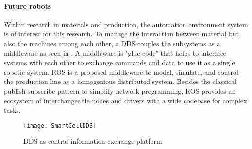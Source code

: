 \paragraph{Future robots}
Within research in materials and production, the automation environment system is of interest for this research.
To manage the interaction between material but also the machines among each other, a \ac{DDS} couples the subsystems as a middleware as seen in . A middleware is "glue code" that helps to interface systems with each other to exchange commands and data to use it as a single robotic system. 
\ac{ROS} is a proposed middleware to model, simulate, and control the production line as a homogenious distributed system. 
Besides the classical publish subscribe  pattern to simplify network programming, \ac{ROS} provides an ecosystem of interchangeable nodes and drivers with a wide codebase for complex tasks.
\medskip
\begin{figure}[H]
	\texttt{[image: SmartCellDDS]}
	\caption{\ac{DDS} as central information exchange platform}
	\label{fig:SmartCellDDS}
\end{figure}

%
